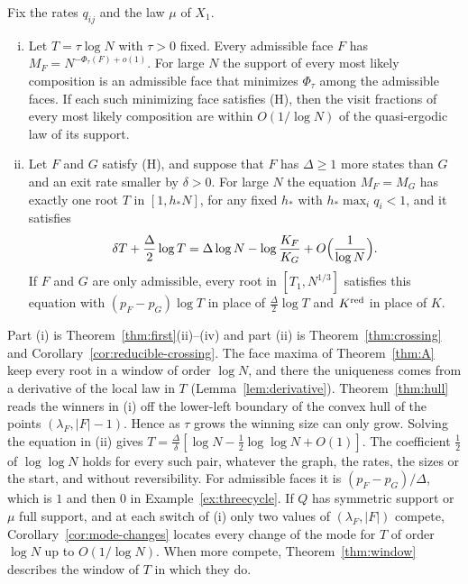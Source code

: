 \begin{introtheorem}\label{thm:B}
Fix the rates $q_{ij}$ and the law $\mu$ of $X_1$.
\begin{enumerate}[(i)]
\item Let $T=\tau\log N$ with $\tau>0$ fixed. Every admissible face $F$ has
$M_F=N^{-\Phi_\tau(F)+o(1)}$. For large $N$ the support of every most likely
composition is an admissible face that minimizes $\Phi_\tau$ among the
admissible faces. If each such minimizing face satisfies \textup{(H)}, then the
visit fractions of every most likely composition are within $O(1/\log N)$ of
the quasi-ergodic law of its support.
\item Let $F$ and $G$ satisfy \textup{(H)}, and suppose that $F$ has
$\Delta\ge1$ more states than $G$ and an exit rate smaller by $\delta>0$. For
large $N$ the equation $M_F=M_G$ has exactly one root $T$ in $[1,h_*N]$, for any
fixed $h_*$ with $h_*\max_iq_i<1$, and it satisfies
\[
 \delta T+\frac\Delta2\log T=\Delta\log N-\log\frac{K_F}{K_G}
 +O\Bigl(\frac1{\log N}\Bigr).
\]
If $F$ and $G$ are only admissible, every root in $[T_1,N^{1/3}]$ satisfies this
equation with $(p_F-p_G)\log T$ in place of $\frac\Delta2\log T$ and $K^{\rm red}$
in place of $K$.
\end{enumerate}
\end{introtheorem}

Part (i) is Theorem~\ref{thm:first}(ii)--(iv) and part (ii) is
Theorem~\ref{thm:crossing} and Corollary~\ref{cor:reducible-crossing}. The face maxima of Theorem~\ref{thm:A} keep every root
in a window of order $\log N$, and there the uniqueness comes from a derivative of
the local law in $T$ (Lemma~\ref{lem:derivative}). Theorem~\ref{thm:hull} reads
the winners in (i) off the lower-left boundary of the convex hull of the points
$(\lambda_F,|F|-1)$. Hence as $\tau$ grows the winning size can only grow. Solving
the equation in (ii) gives $T=\frac\Delta\delta[\log N-\frac12\log\log N+O(1)]$.
The coefficient $\frac12$ of $\log\log N$ holds for every such pair, whatever
the graph, the rates, the sizes or the start, and without reversibility. For
admissible faces it is $(p_F-p_G)/\Delta$, which is $1$ and then $0$ in
Example~\ref{ex:threecycle}. If $Q$ has
symmetric support or $\mu$ full support, and at each switch of (i) only two
values of $(\lambda_F,|F|)$ compete, Corollary~\ref{cor:mode-changes} locates
every change of the mode for $T$ of order $\log N$ up to $O(1/\log N)$. When
more compete, Theorem~\ref{thm:window} describes the window of $T$ in which they
do.

